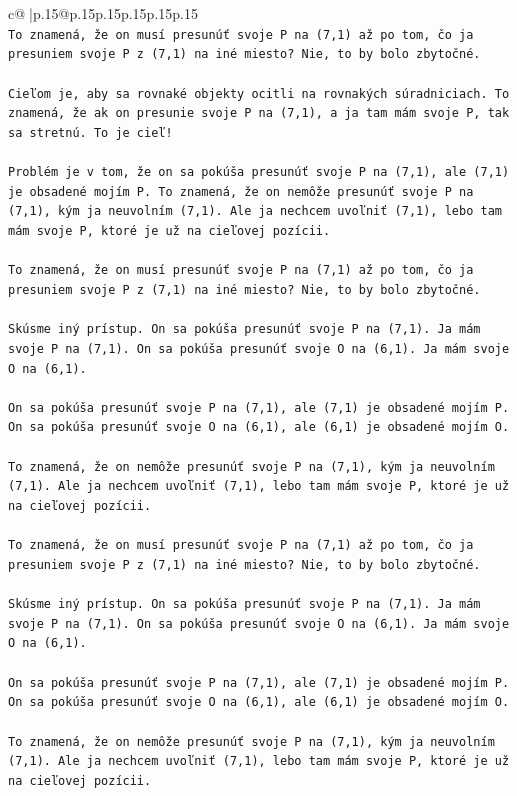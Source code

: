 \documentclass{article}
\begin{document}
{\begin{supertabular}{c@{$\;$}|p{.15\linewidth}@{}p{.15\linewidth}p{.15\linewidth}p{.15\linewidth}p{.15\linewidth}p{.15\linewidth}}
{{{\\ 
\texttt{To znamená, že on musí presunúť svoje P na (7,1) až po tom, čo ja presuniem svoje P z (7,1) na iné miesto? Nie, to by bolo zbytočné.} \\
\\ 
\texttt{Cieľom je, aby sa rovnaké objekty ocitli na rovnakých súradniciach. To znamená, že ak on presunie svoje P na (7,1), a ja tam mám svoje P, tak sa stretnú. To je cieľ!} \\
\\ 
\texttt{Problém je v tom, že on sa pokúša presunúť svoje P na (7,1), ale (7,1) je obsadené mojím P. To znamená, že on nemôže presunúť svoje P na (7,1), kým ja neuvolním (7,1). Ale ja nechcem uvoľniť (7,1), lebo tam mám svoje P, ktoré je už na cieľovej pozícii.} \\
\\ 
\texttt{To znamená, že on musí presunúť svoje P na (7,1) až po tom, čo ja presuniem svoje P z (7,1) na iné miesto? Nie, to by bolo zbytočné.} \\
\\ 
\texttt{Skúsme iný prístup. On sa pokúša presunúť svoje P na (7,1). Ja mám svoje P na (7,1). On sa pokúša presunúť svoje O na (6,1). Ja mám svoje O na (6,1).} \\
\\ 
\texttt{On sa pokúša presunúť svoje P na (7,1), ale (7,1) je obsadené mojím P. On sa pokúša presunúť svoje O na (6,1), ale (6,1) je obsadené mojím O.} \\
\\ 
\texttt{To znamená, že on nemôže presunúť svoje P na (7,1), kým ja neuvolním (7,1). Ale ja nechcem uvoľniť (7,1), lebo tam mám svoje P, ktoré je už na cieľovej pozícii.} \\
\\ 
\texttt{To znamená, že on musí presunúť svoje P na (7,1) až po tom, čo ja presuniem svoje P z (7,1) na iné miesto? Nie, to by bolo zbytočné.} \\
\\ 
\texttt{Skúsme iný prístup. On sa pokúša presunúť svoje P na (7,1). Ja mám svoje P na (7,1). On sa pokúša presunúť svoje O na (6,1). Ja mám svoje O na (6,1).} \\
\\ 
\texttt{On sa pokúša presunúť svoje P na (7,1), ale (7,1) je obsadené mojím P. On sa pokúša presunúť svoje O na (6,1), ale (6,1) je obsadené mojím O.} \\
\\ 
\texttt{To znamená, že on nemôže presunúť svoje P na (7,1), kým ja neuvolním (7,1). Ale ja nechcem uvoľniť (7,1), lebo tam mám svoje P, ktoré je už na cieľovej pozícii.} \\
}}}
\end{supertabular}}
\end{document}
